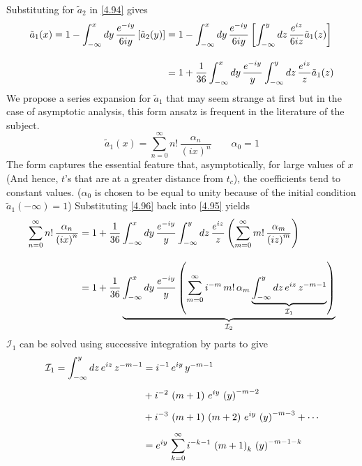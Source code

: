 \documentclass[12pt,a4paper]{article}
\begin{document}
	Substituting for $\tilde{a}_{2}$ in \eqref{4.94} gives
	\begin{align}
		\tilde{a}_{1}(x) = 1 - \int_{-\infty}^{x} dy\, \dfrac{e^{-iy}}{6iy} \left[ \tilde{a}_{2}(y) \right] &= 1 - \int_{-\infty}^{x} dy\, \dfrac{e^{-iy}}{6iy} \left[ \int_{-\infty}^{y} dz\, \dfrac{e^{iz}}{6iz} \tilde{a}_{1}(z) \right] \notag \\[10pt]
		&= 1 + \frac{1}{36} \int_{-\infty}^{x} dy\, \frac{e^{-iy}}{y} \int_{-\infty}^{y} dz\, \dfrac{e^{iz}}{z} \tilde{a}_{1}(z) \label{4.95}
	\end{align}
	We propose a series expansion for $\tilde{a}_{1}$ that may seem strange at first but in the case of asymptotic analysis, this form ansatz is frequent in the literature of the subject.
	\begin{equation}
		\tilde{a}_{1}(x) = \sum_{n = 0}^{\infty} n!\, \dfrac{\alpha_{n}}{\left( ix \right)^{n}} \qquad \alpha_{0} = 1 \label{4.96}
	\end{equation}
	The form captures the essential feature that, asymptotically, for large values of $x$ (And hence, $t$'s that are at a greater distance from $t_{c}$), the coefficients tend to constant values. ($\alpha_{0}$ is chosen to be equal to unity because of the initial condition $\tilde{a}_{1}(-\infty) = 1$) Substituting \eqref{4.96} back into \eqref{4.95} yields
	\begin{align}
		\sum_{n = 0}^{\infty} n!\, \dfrac{\alpha_{n}}{\left( ix \right)^{n}} &= 1 + \frac{1}{36} \int_{-\infty}^{x} dy\, \frac{e^{-iy}}{y} \int_{-\infty}^{y} dz\, \dfrac{e^{iz}}{z} \left( \sum_{m = 0}^{\infty} m!\, \dfrac{\alpha_{m}}{\left( iz \right)^{m}} \right) \notag \\[10pt]
		&= 1 + \frac{1}{36} \underbrace{\int_{-\infty}^{x} dy\, \frac{e^{-iy}}{y} \left( \sum_{m = 0}^{\infty} i^{-m}\, m!\, \alpha_{m} \underbrace{\int_{-\infty}^{y} dz\, e^{iz}\, z^{-m-1}}_{\mathcal{I}_{1}} \right)}_{\mathcal{I}_{2}} \label{4.97}
	\end{align}
	$\mathcal{I}_{1}$ can be solved using successive integration by parts to give
	\begin{align}
		\mathcal{I}_{1} = \int_{-\infty}^{y} dz\, e^{iz}\, z^{-m-1} &= i^{-1}\, e^{iy}\, y^{-m-1} \notag \\[5pt]
		&+ i^{-2}\, \left( m+1 \right)\, e^{iy}\,  \left( y \right)^{-m-2} \notag \\[5pt]
		&+ i^{-3}\, \left( m+1 \right)\, \left( m+2 \right)\, e^{iy}\, \left( y \right)^{-m-3} + \cdots \notag \\[5pt]
		&= e^{iy}\, \sum_{k = 0}^{\infty} i^{-k-1}\, \left( m + 1 \right)_{k}\, \left( y \right)^{-m-1-k} \label{4.98}
	\end{align}
\end{document}
